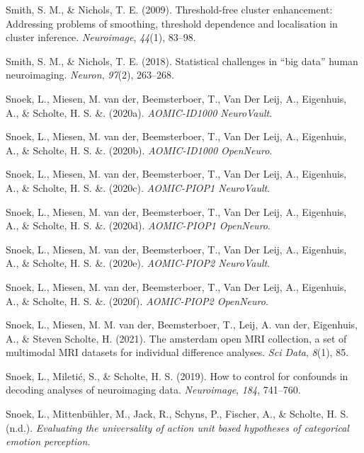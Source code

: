 \documentclass[11pt,american,]{memoir} %
\begin{document}
\leavevmode\hypertarget{ref-smith2009threshold}{}%
Smith, S. M., \& Nichols, T. E. (2009). Threshold-free cluster enhancement: Addressing problems of smoothing, threshold dependence and localisation in cluster inference. \emph{Neuroimage}, \emph{44}(1), 83--98.

\leavevmode\hypertarget{ref-Smith2018-th}{}%
Smith, S. M., \& Nichols, T. E. (2018). Statistical challenges in ``big data'' human neuroimaging. \emph{Neuron}, \emph{97}(2), 263--268.

\leavevmode\hypertarget{ref-Snoek2020n-id1000}{}%
Snoek, L., Miesen, M. van der, Beemsterboer, T., Van Der Leij, A., Eigenhuis, A., \& Scholte, H. S. \&. (2020a). \emph{AOMIC-ID1000 NeuroVault}.

\leavevmode\hypertarget{ref-Snoek2020-id1000}{}%
Snoek, L., Miesen, M. van der, Beemsterboer, T., Van Der Leij, A., Eigenhuis, A., \& Scholte, H. S. \&. (2020b). \emph{AOMIC-ID1000 OpenNeuro}.

\leavevmode\hypertarget{ref-Snoek2020n-piop1}{}%
Snoek, L., Miesen, M. van der, Beemsterboer, T., Van Der Leij, A., Eigenhuis, A., \& Scholte, H. S. \&. (2020c). \emph{AOMIC-PIOP1 NeuroVault}.

\leavevmode\hypertarget{ref-Snoek2020-piop1}{}%
Snoek, L., Miesen, M. van der, Beemsterboer, T., Van Der Leij, A., Eigenhuis, A., \& Scholte, H. S. \&. (2020d). \emph{AOMIC-PIOP1 OpenNeuro}.

\leavevmode\hypertarget{ref-Snoek2020n-piop2}{}%
Snoek, L., Miesen, M. van der, Beemsterboer, T., Van Der Leij, A., Eigenhuis, A., \& Scholte, H. S. \&. (2020e). \emph{AOMIC-PIOP2 NeuroVault}.

\leavevmode\hypertarget{ref-Snoek2020-piop2}{}%
Snoek, L., Miesen, M. van der, Beemsterboer, T., Van Der Leij, A., Eigenhuis, A., \& Scholte, H. S. \&. (2020f). \emph{AOMIC-PIOP2 OpenNeuro}.

\leavevmode\hypertarget{ref-Snoek2021-jx}{}%
Snoek, L., Miesen, M. M. van der, Beemsterboer, T., Leij, A. van der, Eigenhuis, A., \& Steven Scholte, H. (2021). The amsterdam open MRI collection, a set of multimodal MRI datasets for individual difference analyses. \emph{Sci Data}, \emph{8}(1), 85.

\leavevmode\hypertarget{ref-Snoek2019-my}{}%
Snoek, L., Miletić, S., \& Scholte, H. S. (2019). How to control for confounds in decoding analyses of neuroimaging data. \emph{Neuroimage}, \emph{184}, 741--760.

\leavevmode\hypertarget{ref-snoek-submitted}{}%
Snoek, L., Mittenbühler, M., Jack, R., Schyns, P., Fischer, A., \& Scholte, H. S. (n.d.). \emph{Evaluating the universality of action unit based hypotheses of categorical emotion perception}.
\end{document}
